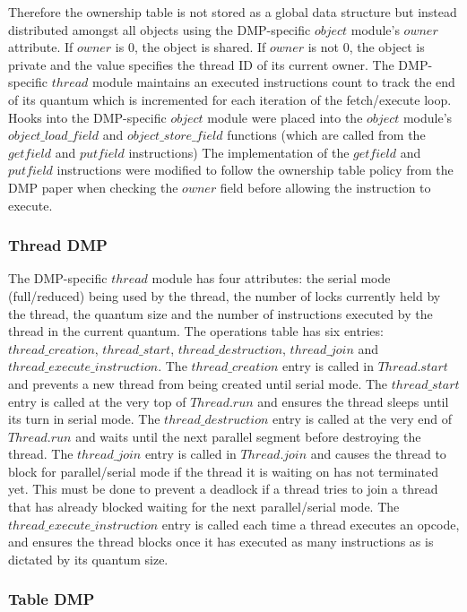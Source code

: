 Therefore the ownership table is not stored as a global data structure
but instead distributed amongst all objects using the DMP-specific
$object$ module's $owner$ attribute.  If $owner$ is $0$, the object is
shared.  If $owner$ is not $0$, the object is private and the value
specifies the thread ID of its current owner.  The DMP-specific
$thread$ module maintains an executed instructions count to track the
end of its quantum which is incremented for each iteration of the
fetch/execute loop.  Hooks into the DMP-specific $object$ module were
placed into the $object$ module's $object\_load\_field$ and
$object\_store\_field$ functions (which are called from the $getfield$
and $putfield$ instructions) The implementation of the $getfield$ and
$putfield$ instructions were modified to follow the ownership table
policy from the DMP paper when checking the $owner$ field before
allowing the instruction to execute.

\subsubsection{Thread DMP}

The DMP-specific $thread$ module has four attributes: the serial mode
(full/reduced) being used by the thread, the number of locks currently
held by the thread, the quantum size and the number of instructions
executed by the thread in the current quantum.  The operations table
has six entries: $thread\_creation$, $thread\_start$,
$thread\_destruction$, $thread\_join$ and
$thread\_execute\_instruction$.  The $thread\_creation$ entry is
called in $Thread.start$ and prevents a new thread from being created
until serial mode.  The $thread\_start$ entry is called at the very
top of $Thread.run$ and ensures the thread sleeps until its turn in
serial mode.  The $thread\_destruction$ entry is called at the very
end of $Thread.run$ and waits until the next parallel segment before
destroying the thread.  The $thread\_join$ entry is called in
$Thread.join$ and causes the thread to block for parallel/serial mode
if the thread it is waiting on has not terminated yet.  This must be
done to prevent a deadlock if a thread tries to join a thread that has
already blocked waiting for the next parallel/serial mode.  The
$thread\_execute\_instruction$ entry is called each time a thread
executes an opcode, and ensures the thread blocks once it has executed
as many instructions as is dictated by its quantum size.

\subsubsection{Table DMP}

